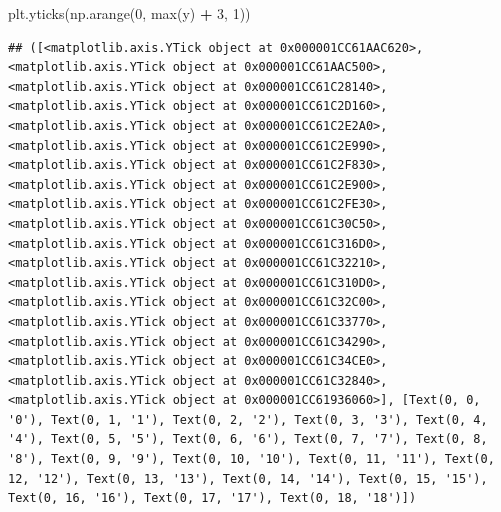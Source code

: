 \documentclass[
]{book}
\newenvironment{Shaded}{\begin{snugshade}}{\end{snugshade}}
\newcommand{\BuiltInTok}[1]{#1}
\newcommand{\DecValTok}[1]{\textcolor[rgb]{0.00,0.00,0.81}{#1}}
\newcommand{\NormalTok}[1]{#1}
\newcommand{\OperatorTok}[1]{\textcolor[rgb]{0.81,0.36,0.00}{\textbf{#1}}}
\begin{document}
\begin{Shaded}
\begin{Highlighting}[]
\NormalTok{plt.yticks(np.arange(}\DecValTok{0}\NormalTok{, }\BuiltInTok{max}\NormalTok{(y) }\OperatorTok{+} \DecValTok{3}\NormalTok{, }\DecValTok{1}\NormalTok{))}
\end{Highlighting}
\end{Shaded}

\begin{verbatim}
## ([<matplotlib.axis.YTick object at 0x000001CC61AAC620>, <matplotlib.axis.YTick object at 0x000001CC61AAC500>, <matplotlib.axis.YTick object at 0x000001CC61C28140>, <matplotlib.axis.YTick object at 0x000001CC61C2D160>, <matplotlib.axis.YTick object at 0x000001CC61C2E2A0>, <matplotlib.axis.YTick object at 0x000001CC61C2E990>, <matplotlib.axis.YTick object at 0x000001CC61C2F830>, <matplotlib.axis.YTick object at 0x000001CC61C2E900>, <matplotlib.axis.YTick object at 0x000001CC61C2FE30>, <matplotlib.axis.YTick object at 0x000001CC61C30C50>, <matplotlib.axis.YTick object at 0x000001CC61C316D0>, <matplotlib.axis.YTick object at 0x000001CC61C32210>, <matplotlib.axis.YTick object at 0x000001CC61C310D0>, <matplotlib.axis.YTick object at 0x000001CC61C32C00>, <matplotlib.axis.YTick object at 0x000001CC61C33770>, <matplotlib.axis.YTick object at 0x000001CC61C34290>, <matplotlib.axis.YTick object at 0x000001CC61C34CE0>, <matplotlib.axis.YTick object at 0x000001CC61C32840>, <matplotlib.axis.YTick object at 0x000001CC61936060>], [Text(0, 0, '0'), Text(0, 1, '1'), Text(0, 2, '2'), Text(0, 3, '3'), Text(0, 4, '4'), Text(0, 5, '5'), Text(0, 6, '6'), Text(0, 7, '7'), Text(0, 8, '8'), Text(0, 9, '9'), Text(0, 10, '10'), Text(0, 11, '11'), Text(0, 12, '12'), Text(0, 13, '13'), Text(0, 14, '14'), Text(0, 15, '15'), Text(0, 16, '16'), Text(0, 17, '17'), Text(0, 18, '18')])
\end{verbatim}
\end{document}
